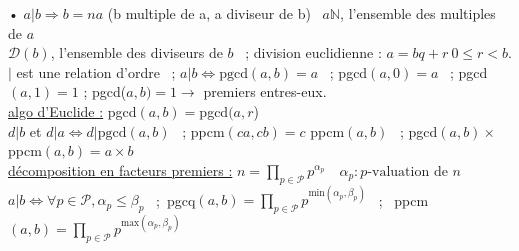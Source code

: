 \documentclass[12 pt]{book}
\begin{document}
\begin{flushleft}
\begin{doublespace}

	• $a|b \Rightarrow b=na$ (b multiple de a, a diviseur de b) \ $a\mathbb{N}$, l'ensemble des multiples de $a$\\
	$\mathcal{D}(b)$, l'ensemble des diviseurs de $b$ \ ;  division euclidienne : $a=bq+r \ 0\leq r<b$.\\
	$|$ est une relation d'ordre \ ; $a|b \Leftrightarrow \text{pgcd}(a,b)=a$ \ ; pgcd$(a,0)=a$ \ ; pgcd$(a,1)=1$ ; pgcd($a,b)=1 \rightarrow$ premiers entres-eux.\\
	\underline{algo d'Euclide :} pgcd$(a,b)=$pgcd$(a,r$)\\
	$d|b$ et $d|a \Leftrightarrow d|\text{pgcd}(a,b)$ \ ; ppcm$(ca,cb)=c$ ppcm$(a,b)$ \ ; pgcd$(a,b) \times$ppcm$(a,b)=a\times b $\\
	\underline{décomposition en facteurs premiers :} $n=\prod\limits_{p\in \mathcal{P}} p^{\alpha_p} \quad \alpha_p:p\text{-valuation de } n$\\
	$a|b \Leftrightarrow \forall p\in \mathcal{P}, \alpha_p \leq \beta_p$ \ ;\ pgcq$(a,b)=\prod\limits_{p\in \mathcal{P}} p^{\text{min}(\alpha_p ,\beta_p)}$ \ ; \ ppcm$(a,b)=\prod\limits_{p\in \mathcal{P}} p^{\text{max}(\alpha_p ,\beta_p)}$\\
	

\end{doublespace}
\end{flushleft}
\end{document}
